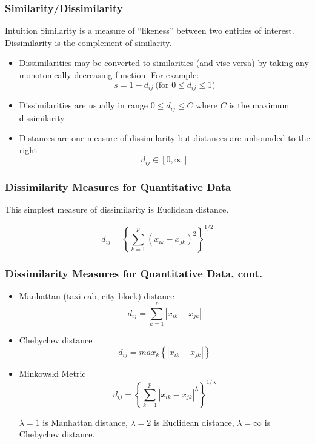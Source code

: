 \documentclass{beamer}
\begin{document}
\begin{frame}
  \frametitle{Similarity/Dissimilarity}

\begin{block}{Intuition}
Similarity is a measure of ``likeness'' between two entities of interest. Dissimilarity is the complement of similarity.
\end{block}


\begin{itemize}

\item Dissimilarities may be converted to similarities (and vise versa) by taking any monotonically decreasing function. For example:
\[
s = 1 - d_{ij}  \ \mbox{(for $0 \leq d_{ij} \leq 1$)}
\]

\item Dissimilarities are usually in range $0 \leq d_{ij} \leq C$ where $C$ is the maximum dissimilarity

\item Distances are one measure of dissimilarity but distances are unbounded to the right
\[
d_{ij} \in [0,\infty]
\]
\end{itemize}
\end{frame}

\begin{frame}
  \frametitle{Dissimilarity Measures for Quantitative Data}

This simplest measure of dissimilarity is Euclidean distance.


\[
d_{ij} = \left\{ \sum_{k=1}^p (x_{ik} - x_{jk})^2 
         \right\} ^{1/2}
\]


\end{frame}

\begin{frame}
  \frametitle{Dissimilarity Measures for Quantitative Data, cont.}


\begin{itemize}

\item Manhattan (taxi cab, city block) distance
\[
d_{ij} = \sum_{k=1}^p | x_{ik} - x_{jk} |         
\]

\item Chebychev distance
\[
d_{ij} = max_k \left\{ | x_{ik} - x_{jk} | \right\}
\]

\item Minkowski Metric
\[
d_{ij} = \left\{ \sum_{k=1}^p |x_{ik} - x_{jk}|^\lambda
         \right\} ^{1/ \lambda}
\]

$\lambda = 1$ is Manhattan distance, $\lambda = 2$ is Euclidean distance, $\lambda = \infty$ is Chebychev distance.

\end{itemize}
\end{frame}
\end{document}
